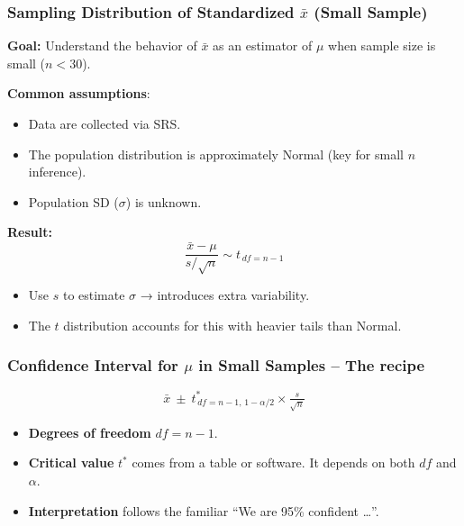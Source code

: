 \documentclass[handout]{beamer}
\begin{document}
\begin{frame}
\frametitle{Sampling Distribution of Standardized $\bar{x}$ (Small Sample)}

\textbf{Goal:} Understand the behavior of $\bar{x}$ as an estimator of $\mu$ when sample size is small ($n < 30$).

\vspace{0.5em}
\textbf{Common assumptions}:
\begin{itemize}
  \item Data are collected via SRS.
  \item The population distribution is approximately Normal (key for small $n$ inference).
  \item Population SD ($\sigma$) is unknown.
\end{itemize}

\vspace{0.5em}
\textbf{Result:}
\[
\frac{\bar{x}-\mu}{s/\sqrt{n}}
 \sim t_{\,df=n-1} 
\]
\vspace{-0.5em}
\begin{itemize}
  \item Use $s$ to estimate $\sigma$ → introduces extra variability.
  \item The $t$ distribution accounts for this with heavier tails than Normal.
\end{itemize}

\end{frame}


\begin{frame}
\frametitle{Confidence Interval for $\mu$ in Small Samples -- The recipe}
\[
\boxed{\;
\bar{x} \ \pm\ t^{\ast}_{\,df=n-1,\,1-\alpha/2} \times
        \tfrac{s}{\sqrt n}
\;}
\]
\begin{itemize}
  \item \textbf{Degrees of freedom} \(df=n-1\).  
  \item \textbf{Critical value} \(t^{\ast}\) comes from a table or software.  It depends on both $df$ and $\alpha$.
  \item \textbf{Interpretation} follows the familiar “We are 95\% confident …”.
\end{itemize}
\end{frame}
\end{document}
